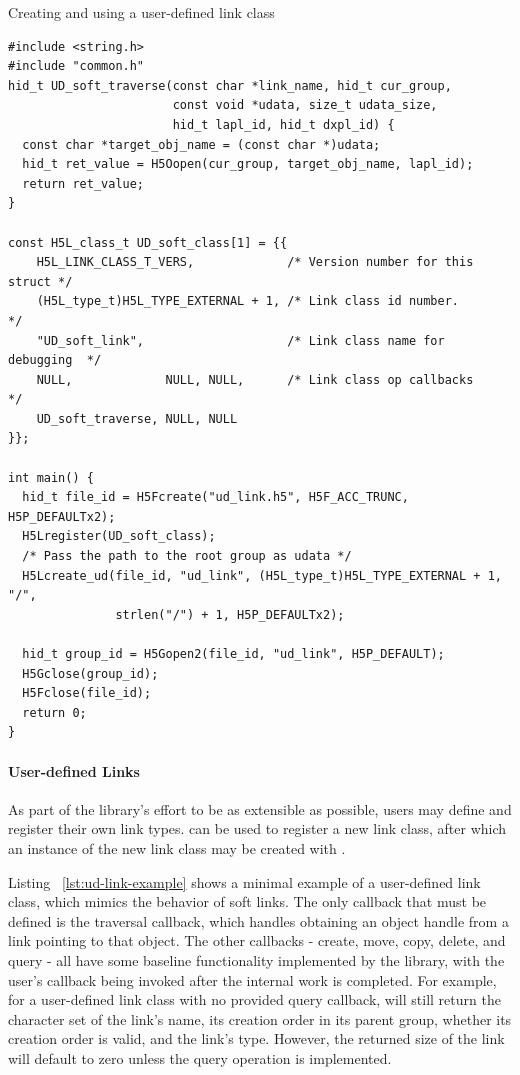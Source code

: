 \begin{listing}
\centering
\caption{Creating and using a user-defined link class}
\label{lst:ud-link-example}
\begin{verbatim}
#include <string.h>
#include "common.h"
hid_t UD_soft_traverse(const char *link_name, hid_t cur_group,
                       const void *udata, size_t udata_size,
                       hid_t lapl_id, hid_t dxpl_id) {
  const char *target_obj_name = (const char *)udata;
  hid_t ret_value = H5Oopen(cur_group, target_obj_name, lapl_id);
  return ret_value;
}

const H5L_class_t UD_soft_class[1] = {{
    H5L_LINK_CLASS_T_VERS,             /* Version number for this struct */
    (H5L_type_t)H5L_TYPE_EXTERNAL + 1, /* Link class id number.          */
    "UD_soft_link",                    /* Link class name for debugging  */
    NULL,             NULL, NULL,      /* Link class op callbacks        */
    UD_soft_traverse, NULL, NULL
}};

int main() {
  hid_t file_id = H5Fcreate("ud_link.h5", H5F_ACC_TRUNC, H5P_DEFAULTx2);
  H5Lregister(UD_soft_class);
  /* Pass the path to the root group as udata */
  H5Lcreate_ud(file_id, "ud_link", (H5L_type_t)H5L_TYPE_EXTERNAL + 1, "/",
               strlen("/") + 1, H5P_DEFAULTx2);

  hid_t group_id = H5Gopen2(file_id, "ud_link", H5P_DEFAULT);
  H5Gclose(group_id);
  H5Fclose(file_id);
  return 0;
}

\end{verbatim}
\end{listing}

\paragraph{User-defined Links} As part of the library's effort to be as extensible as possible, users may define and register their own link types.  can be used to register a new link class, after which an instance of the new link class may be created with .

Listing ~\ref{lst:ud-link-example} shows a minimal example of a user-defined link class, which mimics the behavior of soft links. The only callback that must be defined is the traversal callback, which handles obtaining an object handle from a link pointing to that object. The other callbacks - create, move, copy, delete, and query - all have some baseline functionality implemented by the library, with the user's callback being invoked after the internal work is completed. For example, for a user-defined link class with no provided query callback,  will still return the character set of the link's name, its creation order in its parent group, whether its creation order is valid, and the link's type. However, the returned size of the link will default to zero unless the query operation is implemented.


